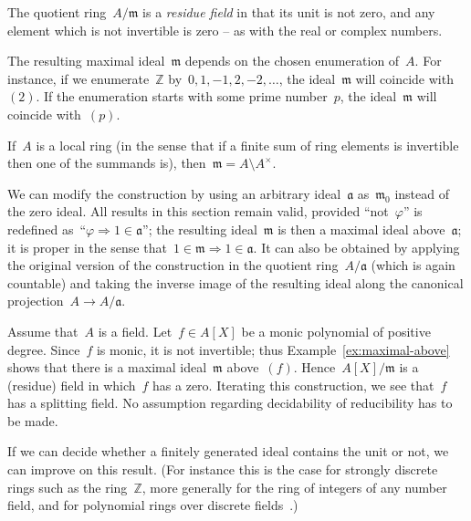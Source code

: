 \documentclass[envcountsect,envcountsame,runningheads]{llncs}
\newcommand{\aaa}{\mathfrak{a}}
\newcommand{\mmm}{\mathfrak{m}}
\newcommand{\ZZ}{\mathbb{Z}}
\renewcommand{\_}{\mathpunct{.}\,}
\begin{document}
The quotient ring~$A/\mmm$ is a \emph{residue field} in that its unit is not
zero, and any element which is not invertible is zero -- as with the real or
complex numbers.

\begin{example}The resulting maximal ideal~$\mmm$ depends on the chosen enumeration
of~$A$. For instance, if we enumerate~$\ZZ$ by~$0,1,-1,2,-2,\ldots$, the
ideal~$\mmm$ will coincide with~$(2)$. If the enumeration starts with some
prime number~$p$, the ideal~$\mmm$ will coincide with~$(p)$.\end{example}

\begin{example}If~$A$ is a local ring (in the sense that if a finite sum of ring
elements is invertible then one of the summands is), then~$\mmm = A \setminus
A^\times$.\end{example}

\begin{example}\label{ex:maximal-above}We can modify the construction by using an
arbitrary ideal~$\aaa$ as~$\mmm_0$ instead of the zero ideal. All results in
this section remain valid, provided ``not~$\varphi$'' is redefined
as~``$\varphi \Rightarrow 1\in\aaa$''; the resulting ideal~$\mmm$ is then a
maximal ideal above~$\aaa$; it is proper in the sense that~$1 \in \mmm
\Rightarrow 1 \in \aaa$. It can also be obtained by applying the original
version of the construction in the quotient ring~$A/\aaa$ (which is again
countable) and taking the inverse image of the resulting ideal along the
canonical projection~$A \to A/\aaa$.\end{example}

\begin{example}Assume that~$A$ is a field. Let~$f \in A[X]$ be a monic
polynomial of positive degree. Since~$f$ is monic, it is not invertible; thus
Example~\ref{ex:maximal-above} shows that there is a maximal ideal~$\mmm$
above~$(f)$. Hence~$A[X]/\mmm$ is a (residue) field in which~$f$ has a zero.
Iterating this construction, we see that~$f$ has a splitting field. No
assumption regarding decidability of reducibility has to be made.\end{example}

If we can decide whether a finitely generated ideal contains the
unit or not, we can improve on this result. (For instance this is the case for
strongly discrete rings such as the ring~$\ZZ$, more generally for the ring of
integers of any number field, and for polynomial rings over discrete
fields~\cite[Theorem~VIII.1.5]{mines-richman-ruitenburg:constructive-algebra}.)
\end{document}
